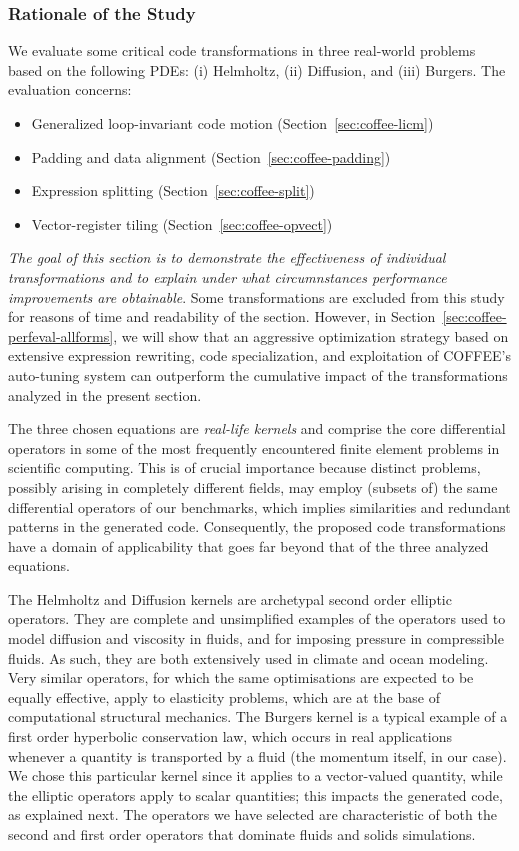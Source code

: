 \subsubsection{Rationale of the Study}
\label{sec:coffee-individual-rationale}
We evaluate some critical code transformations in three real-world problems based on the following PDEs: (i) Helmholtz, (ii) Diffusion, and (iii) Burgers. The evaluation concerns:
\begin{itemize}
\item Generalized loop-invariant code motion (Section~\ref{sec:coffee-licm})
\item Padding and data alignment (Section~\ref{sec:coffee-padding})
\item Expression splitting (Section~\ref{sec:coffee-split})
\item Vector-register tiling (Section~\ref{sec:coffee-opvect})
\end{itemize}
\textit{The goal of this section is to demonstrate the effectiveness of individual transformations and to explain under what circumnstances performance improvements are obtainable}. Some transformations are excluded from this study for reasons of time and readability of the section. However, in Section~\ref{sec:coffee-perfeval-allforms}, we will show that an aggressive optimization strategy based on extensive expression rewriting, code specialization, and exploitation of COFFEE's auto-tuning system can outperform the cumulative impact of the transformations analyzed in the present section.

The three chosen equations are \emph{real-life kernels} and comprise the core differential operators in some of the most frequently encountered finite element problems in scientific computing. This is of crucial importance because distinct problems, possibly arising in completely different fields, may employ (subsets of) the same differential operators of our benchmarks, which implies similarities and redundant patterns in the generated code. Consequently, the proposed code transformations have a domain of applicability that goes far beyond that of the three analyzed equations.

The Helmholtz and Diffusion kernels are archetypal second order elliptic operators. They are complete and unsimplified examples of the operators used to model diffusion and viscosity in fluids, and for imposing pressure in compressible fluids. As such, they are both extensively used in climate and ocean modeling. Very similar operators, for which the same optimisations are expected to be equally effective, apply to elasticity problems, which are at the base of computational structural mechanics. The Burgers kernel is a typical example of a first order hyperbolic conservation law, which occurs in real applications whenever a quantity is transported by a fluid (the momentum itself, in our case). We chose this particular kernel since it applies to a vector-valued quantity, while the elliptic operators apply to scalar quantities; this impacts the generated code, as explained next. The operators we have selected are characteristic of both the second and first order operators that dominate fluids and solids simulations.

